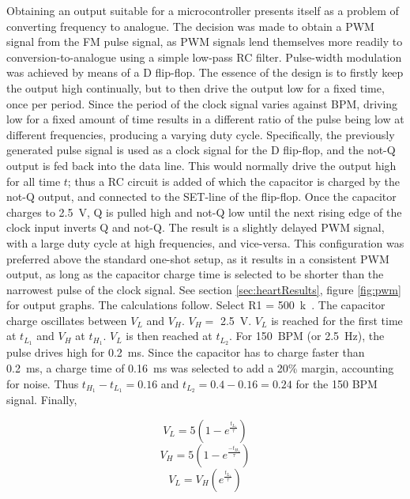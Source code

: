 Obtaining an output suitable for a microcontroller presents itself as a problem of converting frequency to analogue. The decision was made to obtain a PWM signal from the FM pulse signal, as PWM signals lend themselves more readily to conversion-to-analogue using a simple low-pass RC filter. Pulse-width modulation was achieved by means of a D flip-flop. The essence of the design is to firstly keep the output high continually, but to then drive the output low for a fixed time, once per period. Since the period of the clock signal varies against BPM, driving low for a fixed amount of time results in a different ratio of the pulse being low at different frequencies, producing a varying duty cycle. Specifically, the previously generated pulse signal is used as a clock signal for the D flip-flop, and the not-Q output is fed back into the data line. This would normally drive the output high for all time $t$; thus a RC circuit is added of which the capacitor is charged by the not-Q output, and connected to the SET-line of the flip-flop. Once the capacitor charges to \SI{2.5}{V}, Q is pulled high and not-Q low until the next rising edge of the clock input inverts Q and not-Q. The result is a slightly delayed PWM signal, with a large duty cycle at high frequencies, and vice-versa. This configuration was preferred above the standard one-shot setup, as it results in a consistent PWM output, as long as the capacitor charge time is selected to be shorter than the narrowest pulse of the clock signal. See section \ref{sec:heartResults}, figure \ref{fig:pwm} for output graphs. The calculations follow. Select R1 = \SI{500}{k\Omega}. The capacitor charge oscillates between $V_L$ and $V_H$. $V_H =$ \SI{2.5}{V}. $V_L$ is reached for the first time at $t_{L_1}$ and $V_H$ at $t_{H_1}$. $V_L$ is then reached at  $t_{L_2}$. For \SI{150}{BPM} (or \SI{2.5}{Hz}), the pulse drives high for \SI{0.2}{ms}. Since the capacitor has to charge faster than \SI{0.2}{ms}, a charge time of \SI{0.16}{ms} was selected to add a 20\% margin, accounting for noise. Thus $t_{H_1} - t_{L_1} = 0.16$ and $t_{L_2} = 0.4 - 0.16 = 0.24$ for the 150 BPM signal. Finally,

$$V_L = 5\left(1-e^{\frac{t_{L_1}}{\tau}}\right)$$
$$V_H = 5\left(1-e^{\frac{-t_{H_1}}{\tau}}\right)$$
$$V_L = V_H\left(e^{\frac{t_{L_1}}{\tau}}\right)$$

